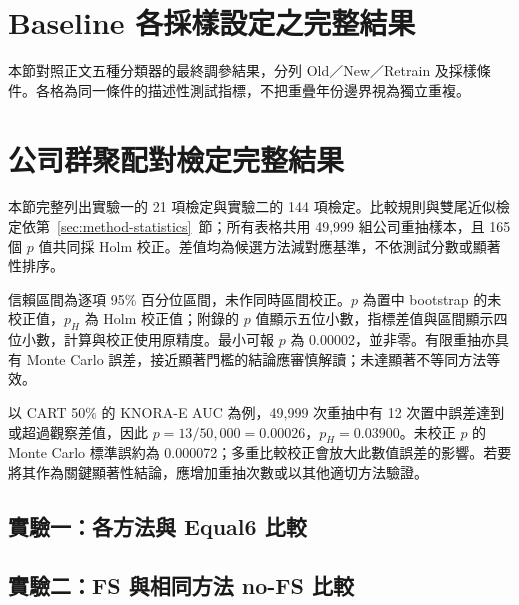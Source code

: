 \clearpage
\section{Baseline 各採樣設定之完整結果}\label{sec:results-baseline-full}

本節對照正文五種分類器的最終調參結果，分列 Old／New／Retrain 及採樣條件。各格為同一條件的描述性測試指標，不把重疊年份邊界視為獨立重複。



\section{公司群聚配對檢定完整結果}\label{sec:stats-full}

本節完整列出實驗一的 21 項檢定與實驗二的 144 項檢定。比較規則與雙尾近似檢定依第~\ref{sec:method-statistics}~節；所有表格共用 49,999 組公司重抽樣本，且 165 個 \(p\) 值共同採 Holm 校正。差值均為候選方法減對應基準，不依測試分數或顯著性排序。

信賴區間為逐項 95\% 百分位區間，未作同時區間校正。\(p\) 為置中 bootstrap 的未校正值，\(p_H\) 為 Holm 校正值；附錄的 \(p\) 值顯示五位小數，指標差值與區間顯示四位小數，計算與校正使用原精度。最小可報 \(p\) 為 0.00002，並非零。有限重抽亦具有 Monte Carlo 誤差，接近顯著門檻的結論應審慎解讀；未達顯著不等同方法等效。

以 CART 50\% 的 KNORA-E AUC 為例，49,999 次重抽中有 12 次置中誤差達到或超過觀察差值，因此 \(p=13/50{,}000=0.00026\)，\(p_H=0.03900\)。未校正 \(p\) 的 Monte Carlo 標準誤約為 0.000072；多重比較校正會放大此數值誤差的影響。若要將其作為關鍵顯著性結論，應增加重抽次數或以其他適切方法驗證。

\subsection*{實驗一：各方法與 Equal6 比較}


\subsection*{實驗二：FS 與相同方法 no-FS 比較}




\clearpage
